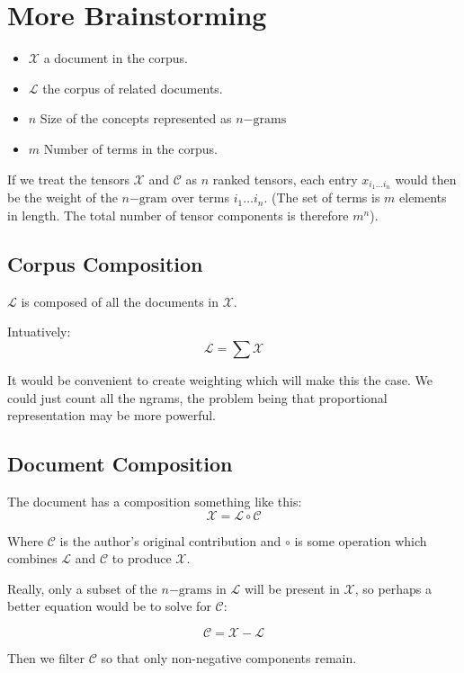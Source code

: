 \documentclass{article}
\begin{document}
\section{More Brainstorming}
\begin{itemize}
\item $\mathcal{X}$ a document in the corpus.
\item $\mathcal{L}$ the corpus of related documents.
\item $n$ Size of the concepts represented as $n\mathrm{-grams}$
\item $m$ Number of terms in the corpus.
\end{itemize}

If we treat the tensors $\mathcal{X}$ and $\mathcal{C}$ as $n$ ranked tensors,
each entry $x_{i_1\ldots i_n}$ would then be the weight of the $n\mathrm{-gram}$
over terms $i_1 \ldots i_n$.  (The set of terms is $m$ elements in length. The 
total number of tensor components is therefore $m^n$).

\subsection{Corpus Composition}
$\mathcal{L}$ is composed of all the documents in $\mathcal{X}$.  

Intuatively:
\[
\mathcal{L}=\displaystyle\sum\mathcal{X}
\]

It would be convenient to create weighting which will make this the case. 
We could just count all the ngrams, the problem being that proportional 
representation may be more powerful.

\subsection{Document Composition}
The document has a composition something like this:
\[
\mathcal{X} = \mathcal{L} \circ \mathcal{C}
\]

Where $\mathcal{C}$ is the author's original contribution and $\circ$ is some
operation which combines $\mathcal{L}$ and $\mathcal{C}$ to produce $\mathcal{X}$.

Really, only a subset of the $n\mathrm{-grams}$ in $\mathcal{L}$ will be present
in $\mathcal{X}$, so perhaps a better equation would be to solve for 
$\mathcal{C}$:

\[
\mathcal{C} = \mathcal{X} - \mathcal{L}
\]

Then we filter $\mathcal{C}$ so that only non-negative components remain.
\end{document}

